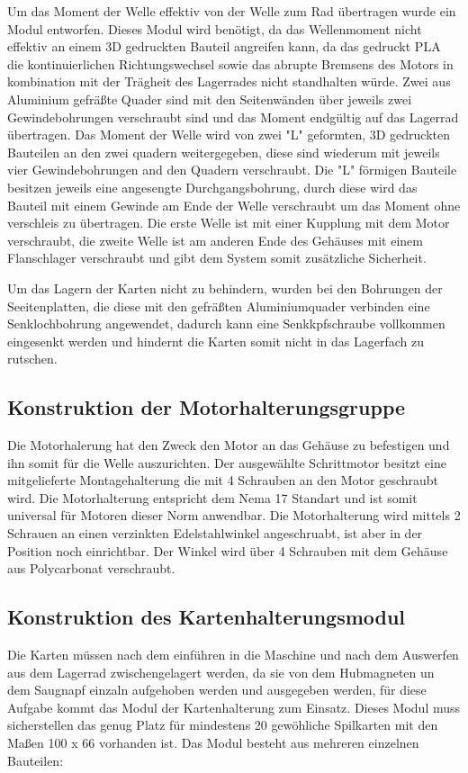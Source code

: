 Um das Moment der Welle effektiv von der Welle zum Rad übertragen wurde ein Modul entworfen. Dieses Modul wird benötigt, da das Wellenmoment nicht effektiv an einem 3D gedruckten Bauteil angreifen kann, da das gedruckt PLA die kontinuierlichen Richtungswechsel
sowie das abrupte Bremsens des Motors in kombination mit der Trägheit des Lagerrades nicht standhalten würde. Zwei aus Aluminium gefräßte Quader sind mit den Seitenwänden über jeweils zwei Gewindebohrungen verschraubt sind und das Moment endgültig auf das
Lagerrad übertragen. Das Moment der Welle wird von zwei "L" geformten, 3D gedruckten Bauteilen an den zwei quadern weitergegeben, diese sind wiederum mit jeweils vier Gewindebohrungen and den Quadern verschraubt. Die "L" förmigen Bauteile besitzen jeweils
eine angesengte Durchgangsbohrung, durch diese wird das Bauteil mit einem Gewinde am Ende der Welle verschraubt um das Moment ohne verschleis zu übertragen. Die erste Welle ist mit einer Kupplung mit dem Motor verschraubt, die zweite Welle ist am anderen
Ende des Gehäuses mit einem Flanschlager verschraubt und gibt dem System somit zusätzliche Sicherheit.

Um das Lagern der Karten nicht zu behindern, wurden bei den Bohrungen der Seeitenplatten, die diese mit den gefräßten Aluminiumquader verbinden eine Senklochbohrung angewendet, dadurch kann eine Senkkpfschraube vollkommen eingesenkt werden und hindernt die Karten
somit nicht in das Lagerfach zu rutschen.

\subsection{Konstruktion der Motorhalterungsgruppe}

Die Motorhalerung hat den Zweck den Motor an das Gehäuse zu befestigen und ihn somit für die Welle auszurichten. Der ausgewählte Schrittmotor
besitzt eine mitgelieferte Montagehalterung die mit 4 Schrauben an den Motor geschraubt wird. Die Motorhalterung entspricht dem Nema 17
Standart und ist somit universal für Motoren dieser Norm anwendbar. Die Motorhalterung wird mittels 2 Schrauen an einen verzinkten Edelstahlwinkel angeschruabt, ist aber
in der Position noch einrichtbar. Der Winkel wird über 4 Schrauben mit dem Gehäuse aus Polycarbonat verschraubt.

\subsection{Konstruktion des Kartenhalterungsmodul}
Die Karten müssen nach dem einführen in die Maschine und nach dem Auswerfen aus dem Lagerrad zwischengelagert werden, da sie
von dem Hubmagneten un dem Saugnapf einzaln aufgehoben werden und ausgegeben werden, für diese Aufgabe kommt das Modul der
Kartenhalterung zum Einsatz. Dieses Modul muss sicherstellen das genug Platz für mindestens 20 gewöhliche Spilkarten mit den Maßen 100 x 66
vorhanden ist. Das Modul besteht aus mehreren einzelnen Bauteilen:

